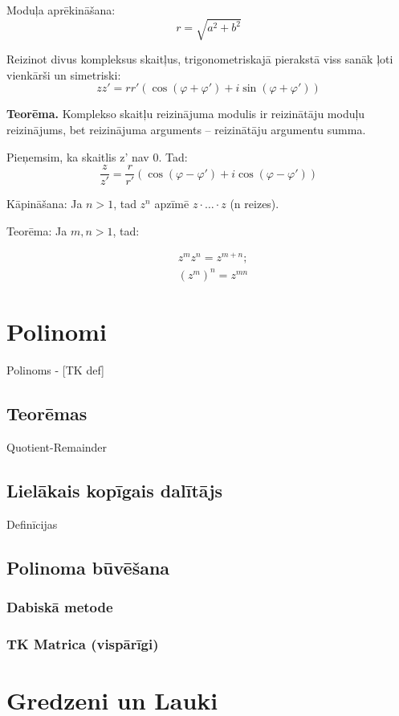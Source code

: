 \documentclass{article}
\begin{document}
Moduļa aprēkināšana:
\begin{equation}
	r=\sqrt{a^2+b^2}
\end{equation}

Reizinot divus kompleksus skaitļus, trigonometriskajā pierakstā
viss sanāk ļoti vienkārši un simetriski:
\begin{equation}
	zz'=rr'(\cos(\varphi+\varphi')+i\sin(\varphi+\varphi'))
\end{equation}

\textbf{Teorēma.} Komplekso skaitļu reizinājuma modulis ir reizinātāju moduļu reizinājums, bet reizinājuma arguments – reizinātāju argumentu summa.

Pieņemsim, ka skaitlis z' nav 0. Tad:
\begin{equation}
	\frac{z}{z'}=\frac{r}{r'}(\cos(\varphi-\varphi')+i\cos(\varphi-\varphi'))
\end{equation}

Kāpināšana:
Ja $n>1$, tad $z^n$ apzīmē $z\cdot\ldots\cdot z$ (n reizes).

Teorēma: Ja $m,n>1$, tad:

\begin{align}
	&z^m z^n = z^{m+n}; \\
	&(z^m)^n=z^{mn}
\end{align}

\section{Polinomi}


Polinoms - [TK def]

\subsection{Teorēmas}
Quotient-Remainder

\subsection{Lielākais kopīgais dalītājs}
Definīcijas

\subsection{Polinoma būvēšana}
\subsubsection{Dabiskā metode}
\subsubsection{TK Matrica (vispārīgi)}

\section{Gredzeni un Lauki}
\end{document}
